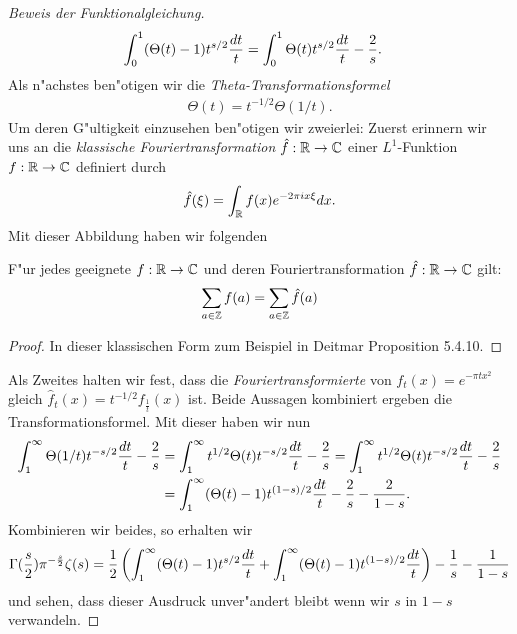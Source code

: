 \begin{proof}[Beweis der Funktionalgleichung]
\begin{align*}
			\int_{0}^{1} (\Theta(t) - 1) t^{s/2}  \frac{\dx[t]}{t} 
				&= \int_{0}^{1} \Theta(t) t^{s/2}  \frac{\dx[t]}{t} - \frac{2}{s}.
		\end{align*}
		Als n"achstes ben"otigen wir die \emph{Theta-Transformationsformel}
		\begin{align*}
			\Theta(t) = t^{-1/2} \Theta(1/t).
		\end{align*}
		Um deren G"ultigkeit einzusehen ben"otigen wir zweierlei: 
		Zuerst erinnern wir uns an die \emph{klassische Fouriertransformation} $\hat{f}:\R\to\Komplex$ einer $L^1$-Funktion $f:\R\to\Komplex$ definiert durch
		\begin{align*}
			\hat{f}(\xi) = \int_\R f(x)e^{-2\pi i x \xi} \dx.
		\end{align*}
		Mit dieser Abbildung haben wir folgenden
		\begin{satz}
			\label{satz:poisson}
			F"ur jedes geeignete $f:\R \to \Komplex$ und deren Fouriertransformation $\hat{f}:\R \to \Komplex$ gilt:
			\begin{align}
				\sum_{a \in \Z} f(a) = \sum_{a \in \Z} \hat{f}(a)
			\end{align}
		\end{satz}
		\begin{proof}
			In dieser klassischen Form zum Beispiel in Deitmar \cite{deitmar2010} Proposition 5.4.10.
		\end{proof}
		Als Zweites halten wir fest, dass die \emph{Fouriertransformierte} von $f_t(x) = e^{-\pi t x^2}$ gleich $\hat{f}_t(x)= t^{-1/2}f_{\frac{1}{t}}(x)$ ist.
		Beide Aussagen kombiniert ergeben die Transformationsformel.
		Mit dieser haben wir nun
		\begin{align*}		
			\int_{1}^{\infty} \Theta(1/t) t^{-s/2}  \frac{\dx[t]}{t} - \frac{2}{s}
				&= \int_{1}^{\infty} t^{1/2} \Theta(t) t^{-s/2}  \frac{\dx[t]}{t} - \frac{2}{s}
				= \int_{1}^{\infty} t^{1/2} \Theta(t) t^{-s/2}  \frac{\dx[t]}{t} - \frac{2}{s}\\
				&= \int_{1}^{\infty} (\Theta(t) - 1) t^{(1-s)/2}  \frac{\dx[t]}{t} - \frac{2}{s} - \frac{2}{1-s}.
		\end{align*}
		Kombinieren wir beides, so erhalten wir
		\begin{align*}
			\Gamma(\frac{s}{2}) \pi^{-\frac{s}{2}} \zeta(s)
				= \frac{1}{2} \left( \int_{1}^{\infty} (\Theta(t) - 1) t^{s/2}  \frac{\dx[t]}{t} + \int_{1}^{\infty} (\Theta(t) - 1) t^{(1-s)/2}  \frac{\dx[t]}{t} \right)  - \frac{1}{s} - \frac{1}{1-s}
		\end{align*}
		und sehen, dass dieser Ausdruck unver"andert bleibt wenn wir $s$ in $1-s$ verwandeln.
	\end{proof}

